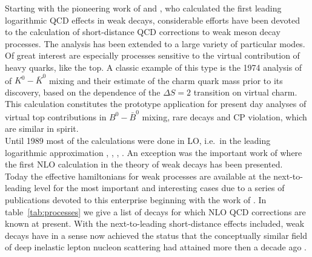 Starting with the pioneering work of \cite{gaillard:74} and
\cite{altarelli:74}, who calculated the first leading logarithmic QCD
effects in weak decays, considerable efforts have been devoted to the
calculation of short-distance QCD corrections to weak meson decay
processes. The analysis has been extended to a large variety of
particular modes. Of great interest are especially processes sensitive
to the virtual contribution of heavy quarks, like the top. A classic
example of this type is the 1974 analysis of \cite{gaillard:74b} of
$K^0 - \bar{K}^0$ mixing and their estimate of the charm quark mass
prior to its discovery, based on the dependence of the $\Delta S=2$
transition on virtual charm. This calculation constitutes the prototype
application for present day analyses of virtual top contributions in
$B^0 - \bar B^0$ mixing, rare decays and CP violation, which are
similar in spirit.
\\
Until 1989 most of the calculations were done in LO, i.e.\ in the
leading logarithmic approximation \cite{vainshtein:77},
\cite{gilman:79}, \cite{gilman:80}, \cite{guberina:80}. An exception
was the important work of \cite{altarelli:81} where the first NLO
calculation in the theory of weak decays has been presented.
\\
Today the effective hamiltonians for weak processes are available at
the next-to-leading level for the most important and interesting cases
due to a series of publications devoted to this enterprise beginning
with the work of \cite{burasweisz:90}. In table~\ref{tab:processes}
we give a list of decays for which NLO QCD corrections are known at
present.  With the next-to-leading short-distance effects included,
weak decays have in a sense now achieved the status that the
conceptually similar field of deep inelastic lepton nucleon scattering
had attained more then a decade ago \cite{buras:80}.

